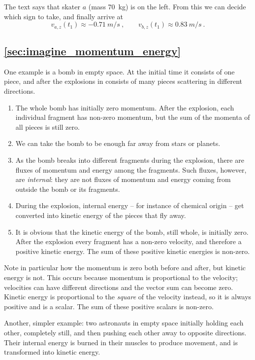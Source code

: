 \documentclass[a4paper,12pt,%
onecolumn,oneside,%
british%
]{memoir}
\newcommand{\solution}[1]{\subsection*{\makebox[0pt][r]{\faIcon[regular]{lightbulb}\enskip}\ref{#1}}%
\addcontentsline{toc}{subsection}{\ref{#1}}%
\label{#1_sol}%
\marginpar{\vspace{-1\baselineskip}\hspace{-8em}\footnotesize Exercise p.~\pageref{#1}}
}%
\renewcommand*{\|}[1][]{\nonscript\:#1\vert\nonscript\:\mathopen{}}
\newcommand*{\ytf}{t_{1}}
\begin{document}
The text says that skater $a$ (mass \qty{70}{kg}) is on the left. From this we can decide which sign to take, and finally arrive at
\begin{equation*}
  v_{a,z}(\ytf) \approx -\qty{0.71}{m/s} \ ,
  \qquad
  v_{b,z}(\ytf) \approx \qty{0.83}{m/s} \ .
\end{equation*}


\solution{sec:imagine_momentum_energy}

One example is a bomb in empty space. At the initial time it consists of one piece, and after the explosions in consists of many pieces scattering in different directions.
\begin{enumerate}[noitemsep]
\item The whole bomb has initially zero momentum. After the explosion, each individual fragment has non-zero momentum, but the sum of the momenta of all pieces is still zero.
\item We can take the bomb to be enough far away from stars or planets.
\item As the bomb breaks into different fragments during the explosion, there are fluxes of momentum and energy among the fragments. Such fluxes, however, are \emph{internal}: they are not fluxes of momentum and energy coming from outside the bomb or its fragments.
\item During the explosion, internal energy -- for instance of chemical origin -- get converted into kinetic energy of the pieces that fly away.
\item It is obvious that the kinetic energy of the bomb, still whole, is initially zero. After the explosion every fragment has a non-zero velocity, and therefore a positive kinetic energy. The sum of these positive kinetic energies is non-zero.
\end{enumerate}
Note in particular how the momentum is zero both before and after, but kinetic energy is not. This occurs because momentum is proportional to the velocity; velocities can have different directions and the vector sum can become zero. Kinetic energy is proportional to the \emph{square} of the velocity instead, so it is always positive and is a scalar. The sum of these positive scalars is non-zero.

Another, simpler example: two astronauts in empty space initially holding each other, completely still, and then pushing each other away to opposite directions. Their internal energy is burned in their muscles to produce movement, and is transformed into kinetic energy.
\end{document}

